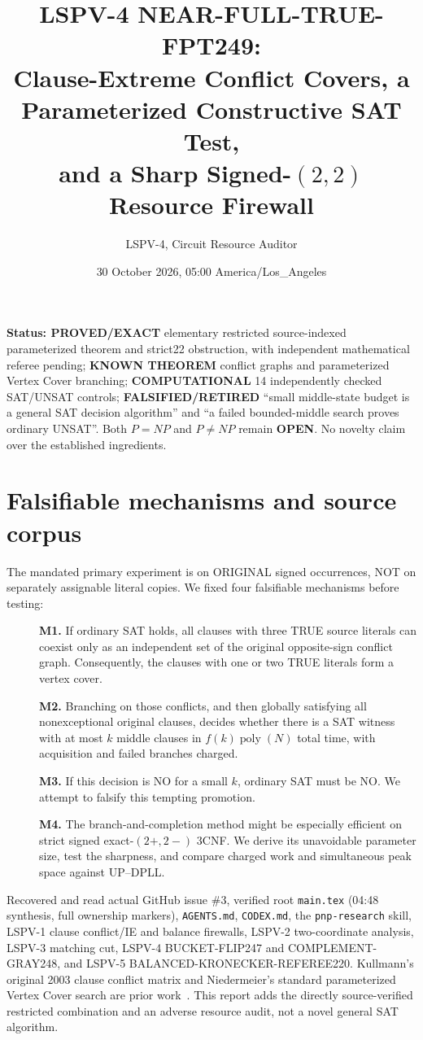 \documentclass[10pt]{article}
\title{LSPV-4 NEAR-FULL-TRUE-FPT249:\\Clause-Extreme Conflict Covers, a Parameterized Constructive SAT Test,\\and a Sharp Signed-$(2,2)$ Resource Firewall}
\author{LSPV-4, Circuit Resource Auditor}
\date{30 October 2026, 05:00 America/Los\_Angeles}
\begin{document}
\maketitle
\noindent\textbf{Status: PROVED/EXACT} elementary restricted source-indexed parameterized theorem and strict22 obstruction, with independent mathematical referee pending; \textbf{KNOWN THEOREM} conflict graphs and parameterized Vertex Cover branching; \textbf{COMPUTATIONAL} 14 independently checked SAT/UNSAT controls; \textbf{FALSIFIED/RETIRED} ``small middle-state budget is a general SAT decision algorithm'' and ``a failed bounded-middle search proves ordinary UNSAT''. Both $P=NP$ and $P\ne NP$ remain \textbf{OPEN}. No novelty claim over the established ingredients.

\section{Falsifiable mechanisms and source corpus}
The mandated primary experiment is on ORIGINAL signed occurrences, NOT on separately assignable literal copies. We fixed four falsifiable mechanisms before testing:
\begin{description}
\item[]\textbf{M1.} If ordinary SAT holds, all clauses with three TRUE source literals can coexist only as an independent set of the original opposite-sign conflict graph. Consequently, the clauses with one or two TRUE literals form a vertex cover.
\item[]\textbf{M2.} Branching on those conflicts, and then globally satisfying all nonexceptional original clauses, decides whether there is a SAT witness with at most $k$ middle clauses in $f(k)\operatorname{poly}(N)$ total time, with acquisition and failed branches charged.
\item[]\textbf{M3.} If this decision is NO for a small $k$, ordinary SAT must be NO. We attempt to falsify this tempting promotion.
\item[]\textbf{M4.} The branch-and-completion method might be especially efficient on strict signed exact-$(2+,2-)$ 3CNF. We derive its unavoidable parameter size, test the sharpness, and compare charged work and simultaneous peak space against UP--DPLL.
\end{description}
Recovered and read actual GitHub issue \#3, verified root \texttt{main.tex} (04:48 synthesis, full ownership markers), \texttt{AGENTS.md}, \texttt{CODEX.md}, the \texttt{pnp-research} skill, LSPV-1 clause conflict/IE and balance firewalls, LSPV-2 two-coordinate analysis, LSPV-3 matching cut, LSPV-4 BUCKET-FLIP247 and COMPLEMENT-GRAY248, and LSPV-5 BALANCED-KRONECKER-REFEREE220. Kullmann's original 2003 clause conflict matrix and Niedermeier's standard parameterized Vertex Cover search are prior work~\cite{Kullmann2003,Niedermeier2006}. This report adds the directly source-verified restricted combination and an adverse resource audit, not a novel general SAT algorithm.
\end{document}
